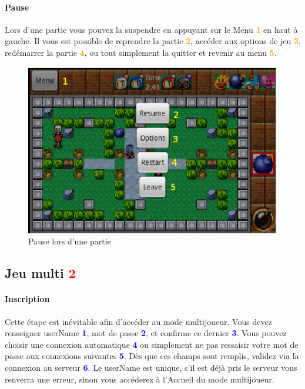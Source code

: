 	\paragraph{Pause\\}
	Lors d'une partie vous pouvez la suspendre en appuyant sur le Menu
	\textcolor{orange}{\textbf{1}} en haut à gauche. Il vous est possible de
	reprendre la partie \textcolor{orange}{\textbf{2}}, accéder aux options de jeu
	\textcolor{orange}{\textbf{3}}, redémarrer la partie
	\textcolor{orange}{\textbf{4}}, ou tout simplement la quitter et revenir au
	menu \textcolor{orange}{\textbf{5}}. 
	
	\begin{figure}[h]
	\centering
		\includegraphics[scale=0.7]{Manuel/Img/20.eps}
		\caption{Pause lors d'une partie}
	\end{figure}


\subsection{Jeu multi \textcolor{red}{2}}

	\paragraph{Inscription}
	Cette étape est inévitable afin d'accéder au mode multijoueur. Vous devez
	renseigner userName \textcolor{blue}{\textbf{1}}, mot de passe
	\textcolor{blue}{\textbf{2}}, et confirme ce dernier
	\textcolor{blue}{\textbf{3}}. Vous pouvez choisir une connexion automatique
	\textcolor{blue}{\textbf{4}} ou simplement ne pas ressaisir votre mot de passe
	aux connexions suivantes \textcolor{blue}{\textbf{5}}. Dès que ces champs sont
	remplis, validez via la connexion au serveur \textcolor{blue}{\textbf{6}}. Le
	userName est unique, s'il est déjà pris le serveur vous renverra une erreur,
	sinon vous accéderez à l'Accueil du mode multijoueur.
	
